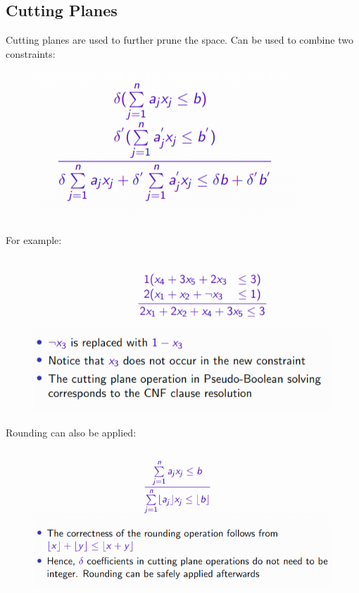\documentclass[10pt,a4paper]{report}
\begin{document}
\subsection{Cutting Planes}
Cutting planes are used to further prune the space. Can be used to combine two constraints:
\begin{figure}[H]
    \centering
    \includegraphics[scale=0.5]{23.png}
\end{figure}
For example:
\begin{figure}[H]
    \centering
    \includegraphics[scale=0.5]{24.png}
\end{figure}
Rounding can also be applied:
\begin{figure}[H]
    \centering
    \includegraphics[scale=0.5]{25.png}
\end{figure}
\end{document}
